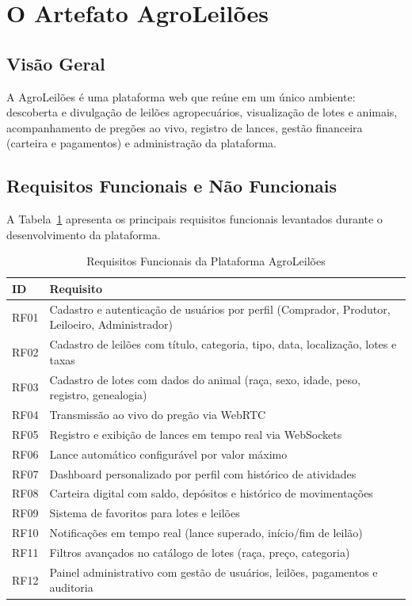\documentclass[12pt]{article}
\begin{document}
\section{O Artefato AgroLeilões}
\label{sec:artefato}

\subsection{Visão Geral}

A AgroLeilões é uma plataforma web que reúne em um único ambiente: descoberta e
divulgação de leilões agropecuários, visualização de lotes e animais, acompanhamento de
pregões ao vivo, registro de lances, gestão financeira (carteira e pagamentos) e
administração da plataforma.

\subsection{Requisitos Funcionais e Não Funcionais}

A Tabela~\ref{tab:rf} apresenta os principais requisitos funcionais levantados durante
o desenvolvimento da plataforma.

\begin{table}[h]
\centering
\caption{Requisitos Funcionais da Plataforma AgroLeilões}
\label{tab:rf}
\begin{tabularx}{\columnwidth}{lX}
\toprule
\textbf{ID} & \textbf{Requisito} \\
\midrule
RF01 & Cadastro e autenticação de usuários por perfil (Comprador, Produtor, Leiloeiro, Administrador) \\
RF02 & Cadastro de leilões com título, categoria, tipo, data, localização, lotes e taxas \\
RF03 & Cadastro de lotes com dados do animal (raça, sexo, idade, peso, registro, genealogia) \\
RF04 & Transmissão ao vivo do pregão via WebRTC \\
RF05 & Registro e exibição de lances em tempo real via WebSockets \\
RF06 & Lance automático configurável por valor máximo \\
RF07 & Dashboard personalizado por perfil com histórico de atividades \\
RF08 & Carteira digital com saldo, depósitos e histórico de movimentações \\
RF09 & Sistema de favoritos para lotes e leilões \\
RF10 & Notificações em tempo real (lance superado, início/fim de leilão) \\
RF11 & Filtros avançados no catálogo de lotes (raça, preço, categoria) \\
RF12 & Painel administrativo com gestão de usuários, leilões, pagamentos e auditoria \\
\bottomrule
\end{tabularx}
\end{table}
\end{document}
